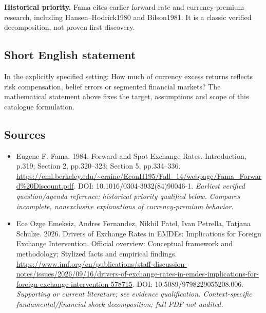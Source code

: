 \documentclass[11pt]{article}
\begin{document}
\par\textbf{Historical priority.} Fama cites earlier forward-rate and currency-premium research, including Hansen–Hodrick1980 and Bilson1981. It is a classic verified decomposition, not proven first discovery.

\subsection{Short English statement}
In the explicitly specified setting: How much of currency excess returns reflects risk compensation, belief errors or segmented financial markets? The mathematical statement above fixes the target, assumptions and scope of this catalogue formulation.

\subsection{Sources}
\begin{itemize}\raggedright
\item[\textnormal{[S1]}]\hypertarget{source:30007614:1}{} Eugene F. Fama. 1984. Forward and Spot Exchange Rates. Introduction, p.319; Section 2, pp.320–323; Section 5, pp.334–336.
\url{https://eml.berkeley.edu/~craine/EconH195/Fall_14/webpage/Fama_Forward%20Discount.pdf}.
DOI: 10.1016/0304-3932(84)90046-1.
{\small\textit{Earliest verified question/agenda reference; historical priority qualified below. Compares incomplete, nonexclusive explanations of currency-premium behavior.}}

\item[\textnormal{[S2]}]\hypertarget{source:30007614:2}{} Ece Ozge Emeksiz, Andres Fernandez, Nikhil Patel, Ivan Petrella, Tatjana Schulze. 2026. Drivers of Exchange Rates in EMDEs: Implications for Foreign Exchange Intervention. Official overview: Conceptual framework and methodology; Stylized facts and empirical findings.
\url{https://www.imf.org/en/publications/staff-discussion-notes/issues/2026/09/16/drivers-of-exchange-rates-in-emdes-implications-for-foreign-exchange-intervention-578715}.
DOI: 10.5089/9798229055208.006.
{\small\textit{Supporting or current literature; see evidence qualification. Context-specific fundamental/financial shock decomposition; full PDF not audited.}}
\end{itemize}
\end{document}
